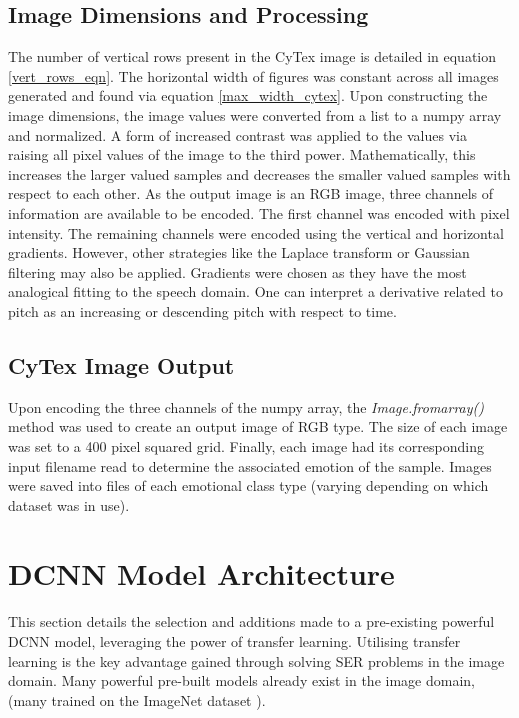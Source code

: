 \subsection{Image Dimensions and Processing}
The number of vertical rows present in the CyTex image is detailed in equation \ref{vert_rows_eqn}. The horizontal width of figures was constant across all images generated and found via equation \ref{max_width_cytex}. Upon constructing the image dimensions, the image values were converted from a list to a numpy array and normalized. A form of increased contrast was applied to the values via raising all pixel values of the image to the third power. Mathematically, this increases the larger valued samples and decreases the smaller valued samples with respect to each other. As the output image is an RGB image, three channels of information are available to be encoded. The first channel was encoded with pixel intensity. The remaining channels were encoded using the vertical and horizontal gradients. However, other strategies like the Laplace transform or Gaussian filtering may also be applied. Gradients were chosen as they have the most analogical fitting to the speech domain. One can interpret a derivative related to pitch as an increasing or descending pitch with respect to time.

\subsection{CyTex Image Output}
Upon encoding the three channels of the numpy array, the \textit{Image.fromarray()} method was used to create an output image of RGB type. The size of each image was set to a 400 pixel squared grid. Finally, each image had its corresponding input filename read to determine the associated emotion of the sample. Images were saved into files of each emotional class type (varying depending on which dataset was in use). 

\section{DCNN Model Architecture}
This section details the selection and additions made to a pre-existing powerful DCNN model, leveraging the power of transfer learning. Utilising transfer learning is the key advantage gained through solving SER problems in the image domain. Many powerful pre-built models already exist in the image domain, (many trained on the ImageNet dataset \cite{deng2009imagenet}).

